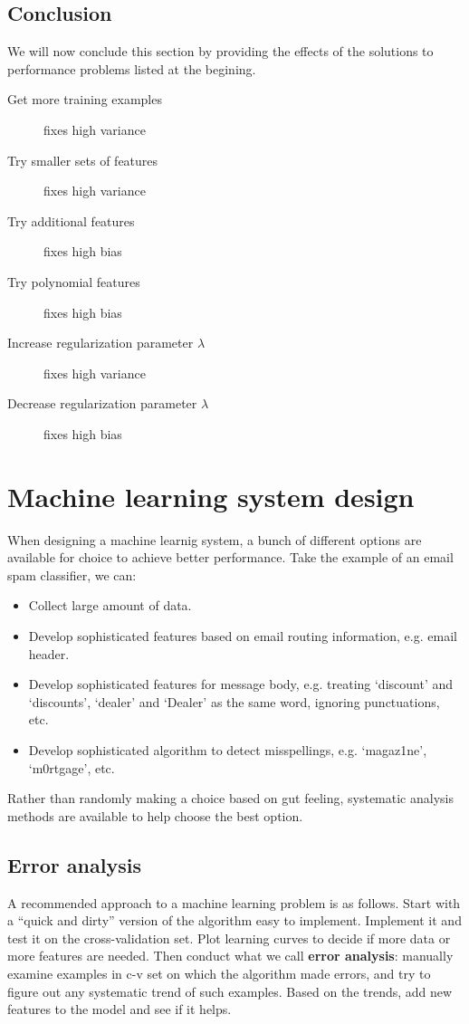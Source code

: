 \subsection{Conclusion}
We will now conclude this section by providing the effects of the solutions to performance problems listed at the begining.
\begin{description}
\item [Get more training examples] fixes high variance
\item [Try smaller sets of features] fixes high variance
\item [Try additional features] fixes high bias
\item [Try polynomial features] fixes high bias
\item [Increase regularization parameter $\lambda$] fixes high variance
\item [Decrease regularization parameter $\lambda$] fixes high bias
\end{description}
\section{Machine learning system design}
When designing a machine learnig system, a bunch of different options are available for choice to achieve better performance. Take the example of an email spam classifier, we can: 
\begin{itemize}
\item Collect large amount of data.
\item Develop sophisticated features based on email routing information, e.g. email header.
\item Develop sophisticated features for message body, e.g. treating `discount' and `discounts', `dealer' and `Dealer' as the same word, ignoring punctuations, etc.
\item Develop sophisticated algorithm to detect misspellings, e.g. `magaz1ne', `m0rtgage', etc.
\end{itemize}
Rather than randomly making a choice based on gut feeling, systematic analysis methods are available to help choose the best option.
\subsection{Error analysis}
A recommended approach to a machine learning problem is as follows. Start with a ``quick and dirty'' version of the algorithm easy to implement. Implement it and test it on the cross-validation set. Plot learning curves to decide if more data or more features are needed. Then conduct what we call {\bf error analysis}: manually examine examples in c-v set on which the algorithm made errors, and try to figure out any systematic trend of such examples. Based on the trends, add new features to the model and see if it helps.
